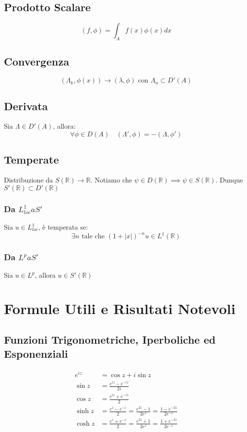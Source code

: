\documentclass[a4paper,notitlepage]{report}%
\newcommand{\R}{\mathbb{R}}%
\begin{document}
\begin{multicols*}{2}
\subsection*{Prodotto Scalare}
\[
    (f,\phi)=\int_A f(x)\phi(x)dx
\]
\subsection*{Convergenza}
\[(\Lambda_k,\phi(x))\to(\lambda,\phi) \text{ con }\Lambda_n\subset D'(A)\]
\subsection*{Derivata}
Sia $\Lambda\in D'(A)$, allora:
\[
    \forall\phi\in D(A) \quad (\Lambda',\phi)=-(\Lambda,\phi')
\]
\subsection*{Temperate}
Distribuzione da $S(\R)\to\R$. Notiamo che $\psi\in D(\R)\implies\psi\in S(\R)$.
Dunque $S'(\R)\subset D'(\R)$
\subsubsection*{Da $L^1_{loc} a S'$}
Sia $u\in L^1_{loc}$, è temperata se:
\[
    \exists n \text{ tale che } (1+|x|)^{-n}u\in L^1(\R)
\]
\subsubsection*{Da $L^p a S'$}
Sia $u\in L^p$, allora $u\in S'(\R)$

\end{multicols*}
\newpage
\section*{Formule Utili e Risultati Notevoli}

\subsection*{Funzioni Trigonometriche, Iperboliche ed Esponenziali}
\begin{align*}
    e^{iz} &= \cos{z}+i\sin{z}\\
    \sin{z} &= \frac{e^{iz}-e^{-iz} }{2i}\\
    \cos{z} &= \frac{e^{iz}+e^{-iz} }{2}\\
    \sinh{z} &= \frac{e^{z}-e^{-z}}{2}= \frac{e^{2z}-1}{2e^z}=\frac{1-e^{-2z}}{2e^{-z}}\\
    \cosh{z} &={\frac {e^{z}+e^{-z}}{2}}={\frac {e^{2z}+1}{2e^{z}}}={\frac {1+e^{-2z}}{2e^{-z}}}
\end{align*}
\end{document}
